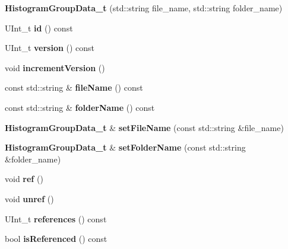 \begin{DoxyCompactItemize}
\item 
{\bfseries Histogram\-Group\-Data\-\_\-t} (std\-::string file\-\_\-name, std\-::string folder\-\_\-name)\label{classhistmgr_1_1HistMgr_1_1HistogramGroupData__t_a07a5f211a1b240c9834f69c67b4f6203}

\item 
U\-Int\-\_\-t {\bfseries id} () const \label{classhistmgr_1_1HistMgr_1_1HistogramGroupData__t_a30189a30c3e48bf0f70779642a4e0b6d}

\item 
U\-Int\-\_\-t {\bfseries version} () const \label{classhistmgr_1_1HistMgr_1_1HistogramGroupData__t_a53a43a01a611eeb58986d06cf112baaf}

\item 
void {\bfseries increment\-Version} ()\label{classhistmgr_1_1HistMgr_1_1HistogramGroupData__t_a523ffb8dee6ceb8c802d7582d65d8a0f}

\item 
const std\-::string \& {\bfseries file\-Name} () const \label{classhistmgr_1_1HistMgr_1_1HistogramGroupData__t_acd20c1c6b5e1204649f0d7603b0f6ee2}

\item 
const std\-::string \& {\bfseries folder\-Name} () const \label{classhistmgr_1_1HistMgr_1_1HistogramGroupData__t_a886cab942d93e6ba0485ed6eb82afd02}

\item 
{\bf Histogram\-Group\-Data\-\_\-t} \& {\bfseries set\-File\-Name} (const std\-::string \&file\-\_\-name)\label{classhistmgr_1_1HistMgr_1_1HistogramGroupData__t_a4d9c6b374964d3def4ac44f60596143d}

\item 
{\bf Histogram\-Group\-Data\-\_\-t} \& {\bfseries set\-Folder\-Name} (const std\-::string \&folder\-\_\-name)\label{classhistmgr_1_1HistMgr_1_1HistogramGroupData__t_a74225cdfb078be31da16dfe9482d62bc}

\item 
void {\bfseries ref} ()\label{classhistmgr_1_1HistMgr_1_1HistogramGroupData__t_a4bc6ddd417970ce1c00d53781b093bb4}

\item 
void {\bfseries unref} ()\label{classhistmgr_1_1HistMgr_1_1HistogramGroupData__t_ab8019cd94a1bdebebb805ddb5d972500}

\item 
U\-Int\-\_\-t {\bfseries references} () const \label{classhistmgr_1_1HistMgr_1_1HistogramGroupData__t_ab3e91d6c35a226699da929e9141fd2a9}

\item 
bool {\bfseries is\-Referenced} () const \label{classhistmgr_1_1HistMgr_1_1HistogramGroupData__t_abedbf506b91a7609e9a9b78a2039a26b}

\end{DoxyCompactItemize}
